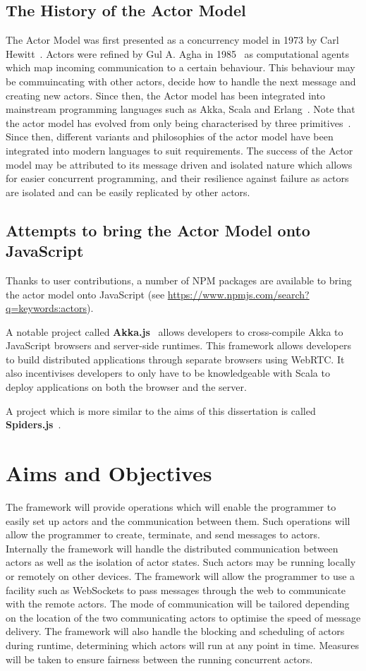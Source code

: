 \documentclass{report}
\begin{document}
\subsection{The History of the Actor Model}
The Actor Model was first presented as a concurrency model in 1973 by Carl Hewitt~\cite{hewitt1973session}. Actors were refined by Gul A. Agha in 1985~\cite{agha1985actors} as computational agents which map incoming communication to a certain behaviour. This behaviour may be commuincating with other actors, decide how to handle the next message and creating new actors. Since then, the Actor model has been integrated into mainstream programming languages such as Akka, Scala and Erlang~\cite{43years}\cite{haller2012integration}. Note that the actor model has evolved from only being characterised by three primitives~\cite{agha1985actors}. Since then, different variants and philosophies of the actor model have been integrated into modern languages to suit requirements. The success of the Actor model may be attributed to its message driven and isolated nature which allows for easier concurrent programming, and their resilience against failure as actors are isolated and can be easily replicated by other actors\cite{reactivemanifesto}.
\subsection{Attempts to bring the Actor Model onto JavaScript}
Thanks to user contributions, a number of NPM packages are available to bring the actor model onto JavaScript (see \url{https://www.npmjs.com/search?q=keywords:actors}). 

A notable project called \textbf{Akka.js}~\cite{stivan2015akka} allows developers to cross-compile Akka to JavaScript browsers and server-side runtimes. This framework allows developers to build distributed applications through separate browsers using WebRTC. It also incentivises developers to only have to be knowledgeable with Scala to deploy applications on both the browser and the server.

A project which is more similar to the aims of this dissertation is called \textbf{Spiders.js}~\cite{spidersjs}. 
\section{Aims and Objectives}
The framework will provide operations which will enable the programmer to easily set up actors and the communication between them. Such operations will allow the programmer to create, terminate, and send messages to actors. Internally the framework will handle the distributed communication between actors as well as the isolation of actor states. Such actors may be running locally or remotely on other devices. The framework will allow the programmer to use a facility such as WebSockets to pass messages through the web to communicate with the remote actors. The mode of communication will be tailored depending on the location of the two communicating actors to optimise the speed of message delivery. The framework will also handle the blocking and scheduling of actors during runtime, determining which actors will run at any point in time. Measures will be taken to ensure fairness between the running concurrent actors.
\end{document}
